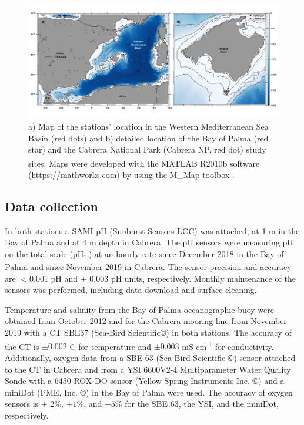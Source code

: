 \begin{figure}[H]
    \centering
    \includegraphics[width=\textwidth]{Figures/Fig_1.jpg}
    \caption[Map of the stations' location in the Western Mediterranean Sea
        Basin]{a) Map of the stations' location in the Western Mediterranean
        Sea Basin (red dots) and b) detailed location of the Bay of Palma (red
        star) and the Cabrera National Park (Cabrera NP, red dot) study sites.
        Maps were developed with the MATLAB\textsuperscript{\textregistered}
        R2010b software (https://mathworks.com) by using the M\_Map
        toolbox \cite{pawlowicz2020m_map}.}
    \label{fig:1}
\end{figure}

\subsection{Data collection}
In both stations a SAMI-pH (Sunburst Sensors LCC) was attached, at 1 m in
the Bay of Palma and at 4 m depth in Cabrera. The pH sensors were measuring pH
on the total scale (pH\textsubscript{T}) at an hourly rate since December 2018
in the Bay of Palma and since November 2019 in Cabrera. The sensor precision
and accuracy are $<$0.001 pH and $\pm$ 0.003 pH units, respectively. Monthly
maintenance of the sensors was performed, including data download and surface
cleaning.

Temperature and salinity from the Bay of Palma oceanographic buoy were
obtained from October 2012 and for the Cabrera mooring line from November 2019
with a CT SBE37 (Sea-Bird Scientific©) in both stations. The accuracy of the CT
is $± 0.002$ \textdegree C for temperature and $± 0.003$ mS
cm\textsuperscript{-1} for conductivity. Additionally, oxygen data from a SBE
63 (Sea-Bird Scientific ©) sensor attached to the CT in Cabrera and from a YSI
6600V2-4 Multiparameter Water Quality Sonde with a 6450 ROX DO sensor (Yellow
Spring Instruments Inc. ©) \cite{tintore2022} and a miniDot (PME, Inc. ©) in
the Bay of Palma were used. The accuracy of oxygen sensors is $\pm$ 2\%, $\pm
    1\%$, and $\pm 5\%$ for the SBE 63, the YSI, and the miniDot, respectively.

